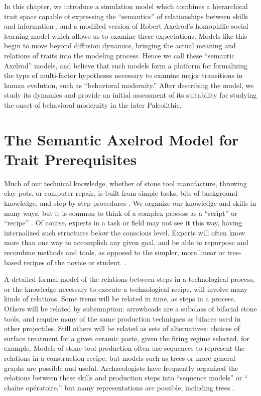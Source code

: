 \documentclass[graybox,natbib]{svmult}
\begin{document}
In this chapter, we introduce a simulation model which combines a
hierarchical trait space capable of expressing the ``semantics'' of
relationships between skills and information \citep{Mesoudi2008a}, and a
modified version of Robert Axelrod's \citep{axelrod1997} homophilic
social learning model which allows us to examine these expectations.
Models like this begin to move beyond diffusion dynamics, bringing the
actual meaning and relations of traits into the modeling process. Hence
we call these ``semantic Axelrod'' models, and believe that such models
form a platform for formalizing the type of multi-factor hypotheses
necessary to examine major transitions in human evolution, such as
``behavioral modernity.'' After describing the model, we study its
dynamics and provide an initial assessment of its suitability for
studying the onset of behavioral modernity in the later Paleolithic.

\section{The Semantic Axelrod Model for Trait
Prerequisites}\label{the-semantic-axelrod-model-for-trait-prerequisites}

Much of our technical knowledge, whether of stone tool manufacture,
throwing clay pots, or computer repair, is built from simple tasks, bits
of background knowledge, and step-by-step procedures
\citep{neff1992ceramics, schiffer1987theory}. We organize our knowledge
and skills in many ways, but it is common to think of a complex process as
a ``script'' or ``recipe'' \citep{schank1977scripts}. Of course, experts
in a task or field may not see it this way, having internalized such
structures below the conscious level. Experts will often know more than
one way to accomplish any given goal, and be able to repurpose and
recombine methods and tools, as opposed to the simpler, more linear or
tree-based recipes of the novice or student.
\citep[e.g.,][]{Bleed:2008in, bleed2002obviously, stout2002skill}.

A detailed formal model of the relations between steps in a
technological process, or the knowledge necessary to execute a
technological recipe, will involve many kinds of relations. Some items
will be related in time, as steps in a process. Others will be related
by subsumption: arrowheads are a subclass of bifacial stone tools, and
require many of the same production techniques as bifaces used in other
projectiles. Still others will be related as sets of alternatives:
choices of surface treatment for a given ceramic paste, given the firing
regime selected, for example. Models of stone tool production often use
sequences to represent the relations in a construction recipe, but
models such as trees or more general graphs are possible and
useful. Archaeologists have frequently organized the relations between
these skills and production steps into ``sequence models'' or
``$\textrm{cha\^ine op\'eratoire}$,'' but many representations are
possible, including trees
\citep{Bamforth:2008kq, Bleed:2008in, Ferguson:2008ce, Hogberg:2008fj, bleed2001trees, bleed2002obviously, schiffer1987theory, stout2002skill}.
\end{document}
